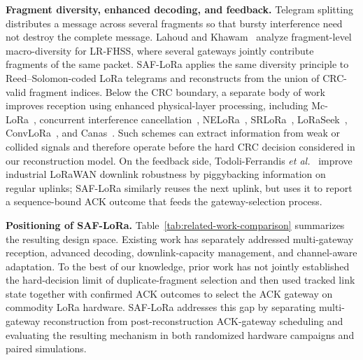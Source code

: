 \documentclass[journal]{IEEEtran}
\begin{document}
\textbf{Fragment diversity, enhanced decoding, and feedback.}
Telegram splitting distributes a message across several fragments so that bursty interference need not destroy the complete message. Lahoud and Khawam~\cite{ts2025} analyze fragment-level macro-diversity for LR-FHSS, where several gateways jointly contribute fragments of the same packet. SAF-LoRa applies the same diversity principle to Reed--Solomon-coded LoRa telegrams and reconstructs from the union of CRC-valid fragment indices. Below the CRC boundary, a separate body of work improves reception using enhanced physical-layer processing, including Mc-LoRa~\cite{mclora2023}, concurrent interference cancellation~\cite{sic2021sigcomm}, NELoRa~\cite{nelora2021}, SRLoRa~\cite{srlora2023}, LoRaSeek~\cite{loraseek2025}, ConvLoRa~\cite{convlora2026}, and Canas~\cite{canas2026}. Such schemes can extract information from weak or collided signals and therefore operate before the hard CRC decision considered in our reconstruction model. On the feedback side, Todoli-Ferrandis \emph{et al.}~\cite{todoli2021} improve industrial LoRaWAN downlink robustness by piggybacking information on regular uplinks; SAF-LoRa similarly reuses the next uplink, but uses it to report a sequence-bound ACK outcome that feeds the gateway-selection process.

\textbf{Positioning of SAF-LoRa.}
Table~\ref{tab:related-work-comparison} summarizes the resulting design space. Existing work has separately addressed multi-gateway reception, advanced decoding, downlink-capacity management, and channel-aware adaptation. To the best of our knowledge, prior work has not jointly established the hard-decision limit of duplicate-fragment selection and then used tracked link state together with confirmed ACK outcomes to select the ACK gateway on commodity LoRa hardware. SAF-LoRa addresses this gap by separating multi-gateway reconstruction from post-reconstruction ACK-gateway scheduling and evaluating the resulting mechanism in both randomized hardware campaigns and paired simulations.
\end{document}
